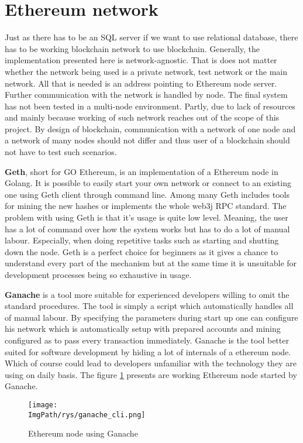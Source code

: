 \documentclass[a4paper,12pt,twoside,openany]{report}
\newcommand{\ImgPath}{.}
\begin{document}
\section{Ethereum network}

Just as there has to be an SQL server if we want to use relational database, there has to be working blockchain network to use blockchain. Generally, the implementation presented here is network-agnostic. That is does not matter whether the network being used is a private network, test network or the main network. All that is needed is an address pointing to Ethereum node server. Further communication with the network is handled by node. The final system has not been tested in a multi-node environment. Partly, due to lack of resources and mainly because working of such network reaches out of the scope of this project. By design of blockchain, communication with a network of one node and a network of many nodes should not differ and thus user of a blockchain should not have to test such scenarios.

\textbf{Geth}, short for GO Ethereum, is an implementation of a Ethereum node in Golang. It is possible to easily start your own network or connect to an existing one using Geth client through command line. Among many Geth includes tools for mining the new hashes or implements the whole web3j RPC standard.  The problem with using Geth is that it's usage is quite low level. Meaning, the user has a lot of command over how the system works but has to do a lot of manual labour. Especially, when doing repetitive tasks such as starting and shutting down the node. Geth is a perfect choice for beginners as it gives a chance to understand every part of the mechanism but at the same time it is unsuitable for development processes being so exhaustive in usage.

\textbf{Ganache} is a tool more suitable for experienced developers willing to omit the standard procedures. The tool is simply a script which automatically handles all of manual labour. By specifying the parameters during start up one can configure his network which is automatically setup with prepared accounts and mining configured as to pass every transaction immediately. Ganache is the tool better suited for software development by hiding a lot of internals of a ethereum node. Which of course could lead to developers unfamiliar with the technology they are using on daily basis. The figure \ref{ganache} presents are working Ethereum node started by Ganache.

\begin{figure}[!htbp]
	\begin{center}
\centering
\texttt{[image: \\ImgPath/rys/ganache\_cli.png]}
\end{center}
	\caption{Ethereum node using Ganache}
	\label{ganache}
\end{figure}
\end{document}
